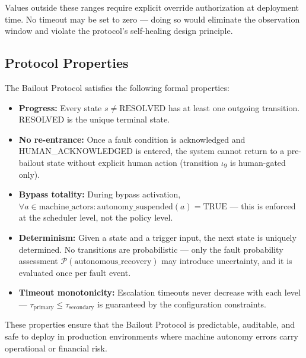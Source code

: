 Values outside these ranges require explicit override authorization at deployment time. No timeout may be set to zero — doing so would eliminate the observation window and violate the protocol's self-healing design principle.

\subsection{Protocol Properties}

The Bailout Protocol satisfies the following formal properties:

\begin{itemize}
  \item \textbf{Progress:} Every state $s \neq \text{RESOLVED}$ has at least one outgoing transition. RESOLVED is the unique terminal state.
  \item \textbf{No re-entrance:} Once a fault condition is acknowledged and HUMAN\_ACKNOWLEDGED is entered, the system cannot return to a pre-bailout state without explicit human action (transition $\iota_9$ is human-gated only).
  \item \textbf{Bypass totality:} During bypass activation, $\forall a \in \text{machine\_actors}: \text{autonomy\_suspended}(a) = \text{TRUE}$ — this is enforced at the scheduler level, not the policy level.
  \item \textbf{Determinism:} Given a state and a trigger input, the next state is uniquely determined. No transitions are probabilistic — only the fault probability assessment $\mathcal{P}(\text{autonomous\_recovery})$ may introduce uncertainty, and it is evaluated once per fault event.
  \item \textbf{Timeout monotonicity:} Escalation timeouts never decrease with each level — $\tau_{\text{primary}} \leq \tau_{\text{secondary}}$ is guaranteed by the configuration constraints.
\end{itemize}

These properties ensure that the Bailout Protocol is predictable, auditable, and safe to deploy in production environments where machine autonomy errors carry operational or financial risk.
